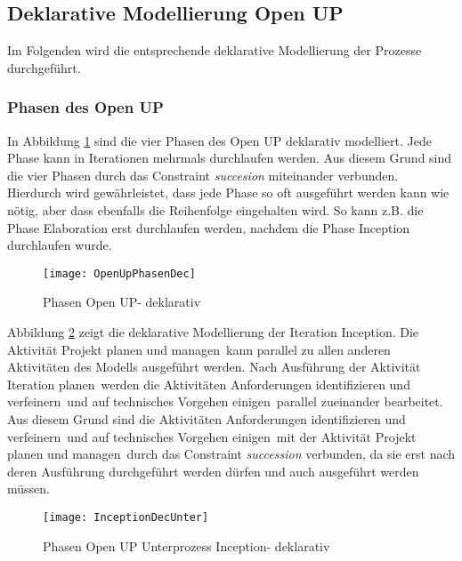 \clearpage

\subsection{Deklarative Modellierung Open UP}

Im Folgenden wird die entsprechende deklarative Modellierung der Prozesse durchgeführt.

\subsubsection{Phasen des Open UP}


In Abbildung \ref{fig:OpenUpPhasenDec} sind die vier Phasen des Open UP deklarativ modelliert. Jede Phase kann in Iterationen mehrmals durchlaufen werden. Aus diesem Grund sind die vier Phasen durch das Constraint \textit{succesion} miteinander verbunden. Hierdurch wird gewährleistet, dass jede Phase so oft ausgeführt werden kann wie nötig, aber dass ebenfalls die Reihenfolge eingehalten wird. So kann z.B. die Phase Elaboration erst durchlaufen werden, nachdem die Phase Inception durchlaufen wurde.
\begin{figure}[htp]
\begin{center}
  \texttt{[image: OpenUpPhasenDec]} %
  \caption{Phasen Open UP- deklarativ}
  \label{fig:OpenUpPhasenDec}
\end{center}
\end{figure}




Abbildung \ref{fig:InceptionDecUnter} zeigt die deklarative Modellierung der Iteration \grqq Inception\grqq. Die Aktivität \grqq Projekt planen und managen\grqq \  kann parallel zu allen anderen Aktivitäten des Modells ausgeführt werden.\newline
Nach Ausführung der Aktivität \grqq Iteration planen\grqq \ werden die Aktivitäten \grqq Anforderungen identifizieren und verfeinern\grqq \ und \grqq auf technisches Vorgehen einigen\grqq \ parallel zueinander bearbeitet. Aus diesem Grund sind die Aktivitäten \grqq Anforderungen identifizieren und verfeinern\grqq \ und \grqq auf technisches Vorgehen einigen\grqq \ mit der Aktivität \grqq Projekt planen und managen\grqq \ durch das Constraint \textit{succession} verbunden, da sie erst nach deren Ausführung durchgeführt werden dürfen und auch ausgeführt werden müssen. \newline

\begin{figure}[htp]
\begin{center}
  \texttt{[image: InceptionDecUnter]} %
  \caption{Phasen Open UP Unterprozess Inception- deklarativ}
  \label{fig:InceptionDecUnter}
\end{center}
\end{figure}



